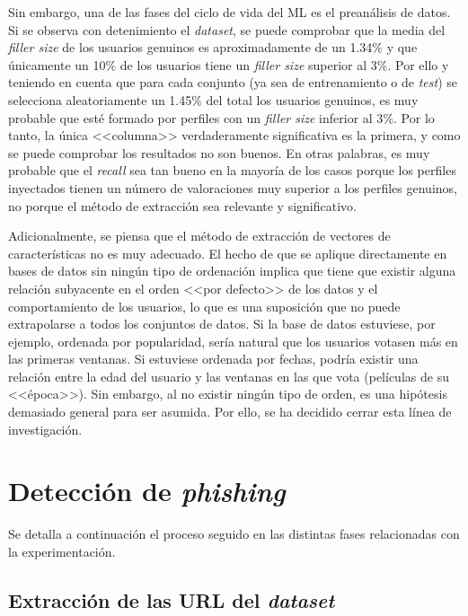 Sin embargo, una de las fases del ciclo de vida del ML es el preanálisis de datos. Si se observa con detenimiento el \textit{dataset}, se puede comprobar que la media del \textit{filler size} de los usuarios genuinos es aproximadamente de un 1.34$\%$ y que únicamente un 10$\%$ de los usuarios tiene un \textit{filler size} superior al 3$\%$. Por ello y teniendo en cuenta que para cada conjunto (ya sea de entrenamiento o de \textit{test}) se selecciona aleatoriamente un 1.45\% del total los usuarios genuinos, es muy probable que esté formado por perfiles con un \textit{filler size} inferior al 3$\%$. Por lo tanto, la única <<columna>> verdaderamente significativa es la primera, y como se puede comprobar los resultados no son buenos. En otras palabras, es muy probable que el \textit{recall} sea tan bueno en la mayoría de los casos porque los perfiles inyectados tienen un número de valoraciones muy superior a los perfiles genuinos, no porque el método de extracción sea relevante y significativo.

Adicionalmente, se piensa que el método de extracción de vectores de características no es muy adecuado. El hecho de que se aplique directamente en bases de datos sin ningún tipo de ordenación implica que tiene que existir alguna relación subyacente en el orden <<por defecto>> de los datos y el comportamiento de los usuarios, lo que es una suposición que no puede extrapolarse a todos los conjuntos de datos. Si la base de datos estuviese, por ejemplo, ordenada por popularidad, sería natural que los usuarios votasen más en las primeras ventanas. Si estuviese ordenada por fechas, podría existir una relación entre la edad del usuario y las ventanas en las que vota (películas de su <<época>>). Sin embargo, al no existir ningún tipo de orden, es una hipótesis demasiado general para ser asumida. Por ello, se ha decidido cerrar esta línea de investigación.


\section{Detección de \textit{phishing}}
\label{sec:5_phishing}
Se detalla a continuación el proceso seguido en las distintas fases relacionadas con la experimentación.

\subsection{Extracción de las URL del \textit{dataset}}

